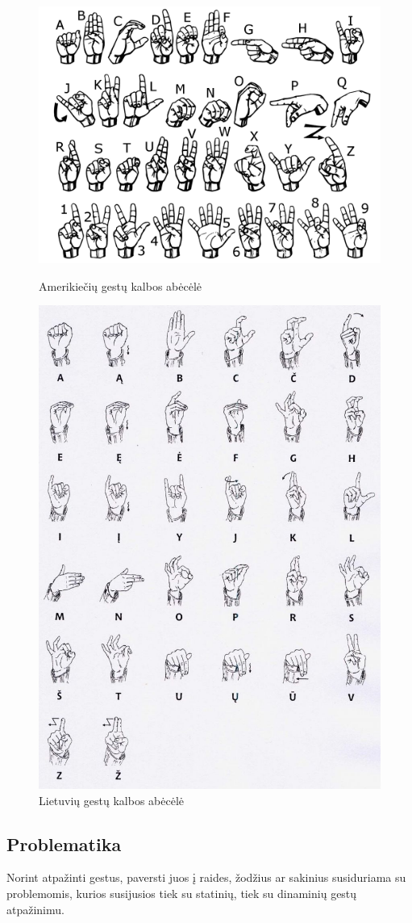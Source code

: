 \documentclass{VUMIFInfKursinis}
\begin{document}
\begin{figure}[H]
	\centering
	\begin{minipage}{.5\textwidth}
		\centering
		\includegraphics[width=.8\linewidth]{img/asl_alphabet}
		\caption{Amerikiečių gestų kalbos abėcėlė}
		\label{img:asl_alphabet}
	\end{minipage}%
	\begin{minipage}{.5\textwidth}
		\centering
		\includegraphics[width=.5\linewidth]{img/lsl_alphabet}
		\caption{Lietuvių gestų kalbos abėcėlė}
		\label{img:lsl_alphabet}
	\end{minipage}
\end{figure}

\subsection{Problematika}
Norint atpažinti gestus, paversti juos į raides, žodžius ar sakinius susiduriama su problemomis, kurios susijusios tiek su statinių, tiek su dinaminių gestų atpažinimu.
\end{document}
